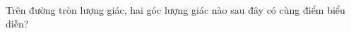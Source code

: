 \begin{ex}
Trên đường tròn lượng giác, hai góc lượng giác nào sau đây có cùng điểm biểu diễn?
\end{ex}
